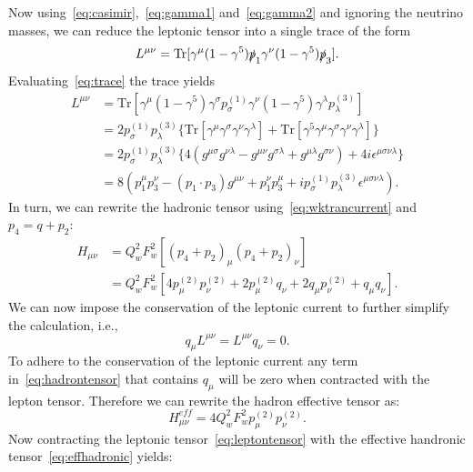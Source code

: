 Now using~\eqref{eq:casimir},~\eqref{eq:gamma1} and~\eqref{eq:gamma2} and ignoring the neutrino masses, we can reduce the leptonic tensor into a single trace of the form
\begin{equation}\label{eq:trace}
L^{\mu \nu}= \mathrm{Tr}[\gamma ^{\mu}(1-\gamma ^5) \slashed{p}_1\gamma ^{\nu}(1-\gamma ^5)\slashed{p}_3].
\end{equation}
Evaluating~\eqref{eq:trace} the trace yields
\begin{align}
L^{\mu \nu} &= \mathrm{Tr}[\gamma ^{\mu}(1-\gamma ^5) \gamma ^{\sigma} p_{\sigma}^{(1)}\gamma ^{\nu}(1-\gamma ^5)\gamma ^{\lambda} p_{\lambda}^{(3)}] \nonumber 
\\
&= 2 p_{\sigma}^{(1)} p_{\lambda}^{(3)}\{ \mathrm{Tr}[\gamma ^{\mu}\gamma ^{\sigma}\gamma ^{\nu}\gamma ^{\lambda}]+\mathrm{Tr}[\gamma ^5 \gamma ^{\mu}\gamma ^{\sigma}\gamma ^{\nu}\gamma ^{\lambda}]\} \nonumber
\\
&= 2 p_{\sigma}^{(1)} p_{\lambda}^{(3)}\{ 4(g^{\mu \sigma}g^{\nu \lambda} - g^{\mu \nu}g^{\sigma \lambda} + g^{\mu \lambda}g^{\sigma \nu})+4i\epsilon^{\mu \sigma \nu \lambda}\}\nonumber
\\
&= 8 \left( p_1^{\mu}p_3^{\nu}-(p_1\cdot p_3) g^{\mu \nu}+p_1^{\nu}p_3^{\mu} +i p_{\sigma}^{(1)} p_{\lambda}^{(3)} \epsilon ^{\mu \sigma \nu \lambda} \right). \label{eq:leptontensor}
\end{align}
In turn, we can rewrite the hadronic tensor using~\eqref{eq:wktrancurrent} and $p_4=q+p_2$:
\begin{align}
H_{\mu \nu} &= Q_{w}^2 F_{w}^2[(p_4+p_2)_{\mu}(p_4+p_2)_{\nu}] \nonumber \\
&= Q_{w}^2 F_{w}^2[4p_{\mu}^{(2)}p_{\nu}^{(2)}+2p_{\mu}^{(2)}q_{\nu}+2q_{\mu}p_{\nu}^{(2)} +q_{\mu}q_{\nu}].\label{eq:hadrontensor}
\end{align}
We can now impose the conservation of the leptonic current to further simplify the calculation, i.e.,
\begin{equation}
q_{\mu}L^{\mu \nu} = L^{\mu \nu}q_{\nu}=0.
\end{equation}
To adhere to the conservation of the leptonic current any term in~\eqref{eq:hadrontensor} that contains $q_{\mu}$ will be zero when contracted with the lepton tensor. Therefore we can rewrite the hadron effective tensor as:
\begin{equation}\label{eq:effhadronic}
H_{\mu \nu}^{eff}=4Q_{w}^2 F_{w}^2 p_{\mu}^{(2)}p_{\nu}^{(2)}.
\end{equation}
Now contracting the leptonic tensor~\eqref{eq:leptontensor} with the effective handronic tensor~\eqref{eq:effhadronic} yields:
